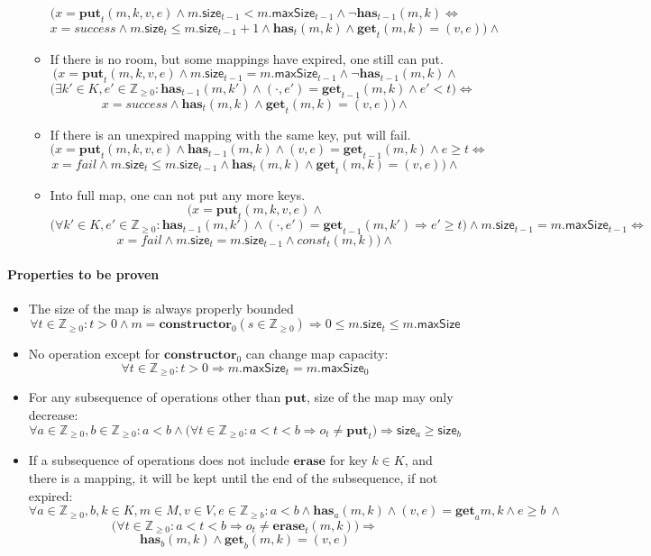\documentclass{article}
\renewcommand{\o}[1]{\ensuremath{\mathbf{#1}}}
\newcommand{\p}[1]{\ensuremath{\mathit{#1}}}
\newcommand{\s}[1]{\ensuremath{\mathsf{#1}}}
\newcommand{\nintset}{\ensuremath{\mathds{Z}_{\ge 0}}}
\newcommand{\moreset}[1]{\ensuremath{\mathds{Z}_{\ge #1}}}
\begin{document}
\begin{itemize}
\begin{itemize}
          $$\Big(x=\o{put}_t(m, k, v, e) \wedge m.\s{size}_{t-1} < m.\s{maxSize}_{t-1} \wedge \neg\o{has}_{t-1}(m, k) \Leftrightarrow $$
          $$ x=success \wedge m.\s{size}_t \le m.\s{size}_{t-1}+1 \wedge \o{has}_t(m, k)\wedge\o{get}_t(m, k) = (v, e)\Big)\wedge$$
        \item If there is no room, but some mappings have expired, one still can put.
          $$\Big(x=\o{put}_t(m, k, v, e) \wedge m.\s{size}_{t-1} = m.\s{maxSize}_{t-1} \wedge \neg\o{has}_{t-1}(m, k) \wedge$$
          $$\big(\exists k'\in K, e'\in \nintset: \o{has}_{t-1}(m,k')\wedge (\cdot,e')=\o{get}_{t-1}(m, k) \wedge e'<t \big) \Leftrightarrow$$
          $$x=success \wedge \o{has}_t(m, k)\wedge\o{get}_t(m, k) = (v, e)\Big)\wedge$$
        \item If there is an unexpired mapping with the same key, put will fail.
          $$\Big(x=\o{put}_t(m, k, v, e) \wedge \o{has}_{t-1}(m, k) \wedge (v, e)=\o{get}_{t-1}(m, k) \wedge e \ge t \Leftrightarrow$$
          $$x=fail \wedge m.\s{size}_t \le m.\s{size}_{t-1} \wedge \o{has}_t(m, k) \wedge \o{get}_t(m, k) = (v, e)\Big)\wedge$$
        \item Into full map, one can not put any more keys.
          $$\Big(x=\o{put}_t(m, k, v, e) \wedge$$
          $$\big(\forall k'\in K,e'\in \nintset :\o{has}_{t-1}(m, k')\wedge(\cdot,e')=\o{get}_{t-1}(m,k') \Rightarrow e' \ge t \big) \wedge m.\s{size}_{t-1} = m.\s{maxSize}_{t-1} \Leftrightarrow$$
          $$x=fail \wedge m.\s{size}_t = m.\s{size}_{t-1} \wedge \p{const}_t(m, k)\Big)\wedge$$
      \end{itemize}
     
\end{itemize}

\paragraph{Properties to be proven}
\begin{itemize}
 \item The size of the map is always properly bounded 
   $$\forall t\in \nintset: t>0  \wedge m=\o{constructor}_0(s \in \nintset) \Rightarrow 0 \le m.\s{size}_t \le m.\s{maxSize}$$
 \item No operation except for $\o{constructor}_0$ can change map capacity:
   $$\forall t\in \nintset: t > 0 \Rightarrow m.\s{maxSize}_t=m.\s{maxSize}_0$$
 \item For any subsequence of operations other than \o{put}, size of the map may only decrease:
   $$\forall a\in \nintset,b\in \nintset: a<b \wedge \big(\forall t\in \nintset:a<t<b \Rightarrow o_t \neq \o{put}_t \big) \Rightarrow \s{size}_a \ge \s{size}_b$$
 \item If a subsequence of operations does not include \o{erase} for key $k\in K$, and there is a mapping, it will be kept until the end of the subsequence, if not expired:
   $$\forall a\in \nintset,b, k\in K, m\in M, v\in V, e\in \moreset{b}: a < b \wedge \o{has}_a(m, k) \wedge (v, e)=\o{get}_a{m, k} \wedge e \ge b ~ \wedge$$
   $$\big(\forall t\in \nintset: a<t<b \Rightarrow o_t\neq \o{erase}_t(m, k)\big) \Rightarrow$$
   $$\o{has}_b(m, k) \wedge \o{get}_b(m, k) = (v,e)$$
\end{itemize}
\end{document}
